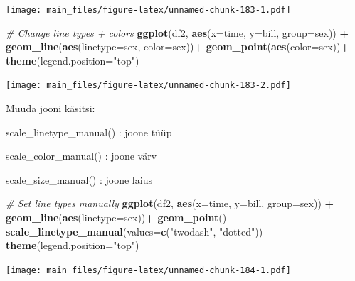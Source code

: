 \documentclass[]{book}
\newenvironment{Shaded}{\begin{snugshade}}{\end{snugshade}}
\newcommand{\KeywordTok}[1]{\textcolor[rgb]{0.13,0.29,0.53}{\textbf{#1}}}
\newcommand{\DataTypeTok}[1]{\textcolor[rgb]{0.13,0.29,0.53}{#1}}
\newcommand{\StringTok}[1]{\textcolor[rgb]{0.31,0.60,0.02}{#1}}
\newcommand{\CommentTok}[1]{\textcolor[rgb]{0.56,0.35,0.01}{\textit{#1}}}
\newcommand{\OperatorTok}[1]{\textcolor[rgb]{0.81,0.36,0.00}{\textbf{#1}}}
\newcommand{\NormalTok}[1]{#1}
\begin{document}
\texttt{[image: main\_files/figure-latex/unnamed-chunk-183-1.pdf]}

\begin{Shaded}
\begin{Highlighting}[]
\CommentTok{# Change line types + colors}
\KeywordTok{ggplot}\NormalTok{(df2, }\KeywordTok{aes}\NormalTok{(}\DataTypeTok{x=}\NormalTok{time, }\DataTypeTok{y=}\NormalTok{bill, }\DataTypeTok{group=}\NormalTok{sex)) }\OperatorTok{+}
\StringTok{  }\KeywordTok{geom_line}\NormalTok{(}\KeywordTok{aes}\NormalTok{(}\DataTypeTok{linetype=}\NormalTok{sex, }\DataTypeTok{color=}\NormalTok{sex))}\OperatorTok{+}
\StringTok{  }\KeywordTok{geom_point}\NormalTok{(}\KeywordTok{aes}\NormalTok{(}\DataTypeTok{color=}\NormalTok{sex))}\OperatorTok{+}
\StringTok{  }\KeywordTok{theme}\NormalTok{(}\DataTypeTok{legend.position=}\StringTok{"top"}\NormalTok{)}
\end{Highlighting}
\end{Shaded}

\texttt{[image: main\_files/figure-latex/unnamed-chunk-183-2.pdf]}

Muuda jooni käsitsi:

scale\_linetype\_manual() : joone tüüp

scale\_color\_manual() : joone värv

scale\_size\_manual() : joone laius

\begin{Shaded}
\begin{Highlighting}[]
\CommentTok{# Set line types manually}
\KeywordTok{ggplot}\NormalTok{(df2, }\KeywordTok{aes}\NormalTok{(}\DataTypeTok{x=}\NormalTok{time, }\DataTypeTok{y=}\NormalTok{bill, }\DataTypeTok{group=}\NormalTok{sex)) }\OperatorTok{+}
\StringTok{  }\KeywordTok{geom_line}\NormalTok{(}\KeywordTok{aes}\NormalTok{(}\DataTypeTok{linetype=}\NormalTok{sex))}\OperatorTok{+}
\StringTok{  }\KeywordTok{geom_point}\NormalTok{()}\OperatorTok{+}
\StringTok{  }\KeywordTok{scale_linetype_manual}\NormalTok{(}\DataTypeTok{values=}\KeywordTok{c}\NormalTok{(}\StringTok{"twodash"}\NormalTok{, }\StringTok{"dotted"}\NormalTok{))}\OperatorTok{+}
\StringTok{  }\KeywordTok{theme}\NormalTok{(}\DataTypeTok{legend.position=}\StringTok{"top"}\NormalTok{)}
\end{Highlighting}
\end{Shaded}

\texttt{[image: main\_files/figure-latex/unnamed-chunk-184-1.pdf]}
\end{document}
